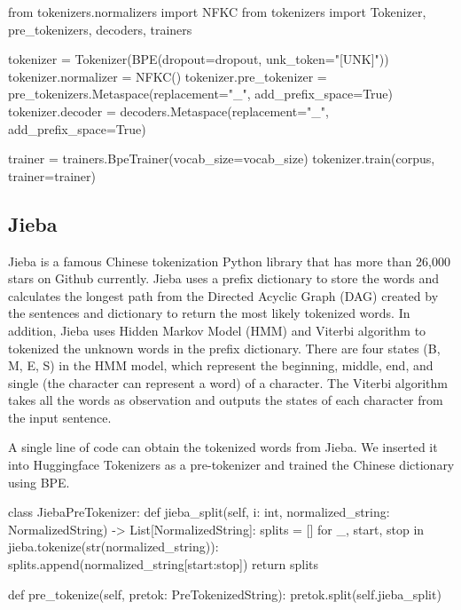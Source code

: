 \vspace{0.5cm}

\begin{python}
from tokenizers.normalizers import NFKC
from tokenizers import Tokenizer, pre_tokenizers, decoders, trainers

tokenizer = Tokenizer(BPE(dropout=dropout, unk_token="[UNK]"))
tokenizer.normalizer = NFKC()
tokenizer.pre_tokenizer = pre_tokenizers.Metaspace(replacement="_", add_prefix_space=True)
tokenizer.decoder = decoders.Metaspace(replacement="_", add_prefix_space=True)

trainer = trainers.BpeTrainer(vocab_size=vocab_size)
tokenizer.train(corpus, trainer=trainer)
\end{python}

\subsection{Jieba} \label{sec:jieba}

Jieba is a famous Chinese tokenization Python library that has more than 26,000 stars on Github currently. Jieba uses a prefix dictionary to store the words and calculates the longest path from the Directed Acyclic Graph (DAG) created by the sentences and dictionary to return the most likely tokenized words. In addition, Jieba uses Hidden Markov Model (HMM) and Viterbi algorithm to tokenized the unknown words in the prefix dictionary. There are four states (B, M, E, S) in the HMM model, which represent the beginning, middle, end, and single (the character can represent a word) of a character. The Viterbi algorithm takes all the words as observation and outputs the states of each character from the input sentence. 

A single line of code  can obtain the tokenized words from Jieba. We inserted it into Huggingface Tokenizers as a pre-tokenizer and trained the Chinese dictionary using BPE.

\vspace{0.5cm}

\begin{python}
    class JiebaPreTokenizer:
    def jieba_split(self, i: int, normalized_string: NormalizedString) -> List[NormalizedString]:
        splits = []
        for _, start, stop in jieba.tokenize(str(normalized_string)):
            splits.append(normalized_string[start:stop])
        return splits
    
    def pre_tokenize(self, pretok: PreTokenizedString):
         pretok.split(self.jieba_split)
\end{python}

